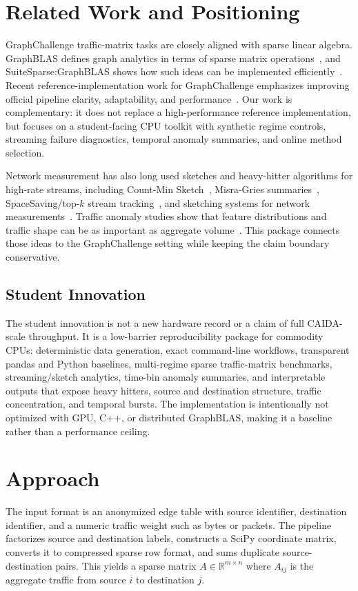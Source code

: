 \documentclass[conference]{IEEEtran}
\begin{document}
\section{Related Work and Positioning}
GraphChallenge traffic-matrix tasks are closely aligned with sparse linear algebra. GraphBLAS defines graph analytics in terms of sparse matrix operations~\cite{buluc2017graphblas}, and SuiteSparse:GraphBLAS shows how such ideas can be implemented efficiently~\cite{davis2019suitesparse}. Recent reference-implementation work for GraphChallenge emphasizes improving official pipeline clarity, adaptability, and performance~\cite{voloshchuk2026improving}. Our work is complementary: it does not replace a high-performance reference implementation, but focuses on a student-facing CPU toolkit with synthetic regime controls, streaming failure diagnostics, temporal anomaly summaries, and online method selection.

Network measurement has also long used sketches and heavy-hitter algorithms for high-rate streams, including Count-Min Sketch~\cite{cormode2005countmin}, Misra-Gries summaries~\cite{misra1982finding}, SpaceSaving/top-$k$ stream tracking~\cite{metwally2005spacesaving}, and sketching systems for network measurements~\cite{kumar2004sketching}. Traffic anomaly studies show that feature distributions and traffic shape can be as important as aggregate volume~\cite{lakhina2005mining}. This package connects those ideas to the GraphChallenge setting while keeping the claim boundary conservative.

\subsection{Student Innovation}
The student innovation is not a new hardware record or a claim of full CAIDA-scale throughput. It is a low-barrier reproducibility package for commodity CPUs: deterministic data generation, exact command-line workflows, transparent pandas and Python baselines, multi-regime sparse traffic-matrix benchmarks, streaming/sketch analytics, time-bin anomaly summaries, and interpretable outputs that expose heavy hitters, source and destination structure, traffic concentration, and temporal bursts. The implementation is intentionally not optimized with GPU, C++, or distributed GraphBLAS, making it a baseline rather than a performance ceiling.

\section{Approach}
The input format is an anonymized edge table with source identifier, destination identifier, and a numeric traffic weight such as bytes or packets. The pipeline factorizes source and destination labels, constructs a SciPy coordinate matrix, converts it to compressed sparse row format, and sums duplicate source-destination pairs. This yields a sparse matrix $A \in \mathbb{R}^{m \times n}$ where $A_{ij}$ is the aggregate traffic from source $i$ to destination $j$.
\end{document}
